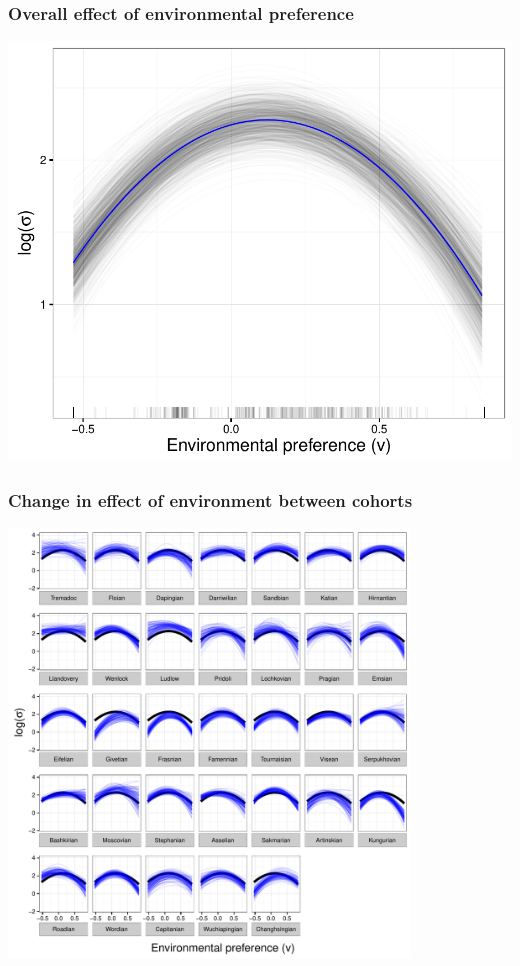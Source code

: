 \documentclass{beamer}
\begin{document}
\begin{frame}
  \frametitle{Overall effect of environmental preference}

  \begin{center}
    \includegraphics[width = \textwidth,height = 0.8\textheight,keepaspectratio = true]{figure/env_effect}
  \end{center}
\end{frame}

\begin{frame}
  \frametitle{Change in effect of environment between cohorts}

  \begin{center}
    \includegraphics[width = 0.8\textwidth,height = 0.8\textheight,keepaspectratio = true]{figure/env_cohort}
  \end{center}
\end{frame}
\end{document}
